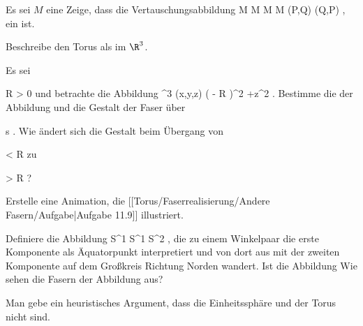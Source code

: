 {}
{

Es sei $M$ eine
Zeige, dass die Vertauschungsabbildung
\maabbeledisp {} {M \times M} { M \times M
} {(P,Q)} {(Q,P)
} {,}
ein
ist.

}
{} {}

{}
{

Beschreibe den Torus
 als
im $\R^3$.

}
{} {}

{}
{

Es sei

\mavergleichskette
{\vergleichskette
{ R
}
{ > }{ 0
}
{  }{
}
{    }{
}
{   }{
}
}
{}{}{}
und betrachte die Abbildung
\maabbeledisp {} { \R^3} { \R
} { (x,y,z) } { \left(  - R  \right)^2 +z^2
} {.}
Bestimme die
der Abbildung und die Gestalt der Faser über

\mavergleichskette
{\vergleichskette
{ s
}
{ \in }{ \R
}
{  }{
}
{    }{
}
{   }{
}
}
{}{}{.}
Wie ändert sich die Gestalt beim Übergang von

\mavergleichskette
{\vergleichskette
{ 
}
{ < }{ R
}
{  }{
}
{    }{
}
{   }{
}
}
{}{}{}
zu

\mavergleichskette
{\vergleichskette
{ 
}
{ > }{ R
}
{  }{
}
{    }{
}
{   }{
}
}
{}{}{?}

}
{} {}

{}
{

Erstelle eine Animation, die
[[Torus/Faserrealisierung/Andere Fasern/Aufgabe|Aufgabe 11.9]]
illustriert.

}
{} {}

{}
{

Definiere die Abbildung
\maabbdisp {} {S^1 \times S^1} { S^2
} {,}
die zu einem Winkelpaar
\mathl{(\alpha, \beta)}{} die erste Komponente als Äquatorpunkt interpretiert und von dort aus mit der zweiten Komponente auf dem Großkreis Richtung Norden wandert. Ist die Abbildung
Wie sehen die Fasern der Abbildung aus?

}
{} {}

{}
{

Man gebe ein heuristisches Argument, dass die Einheitssphäre
 und der Torus
 nicht
sind.

}
{} {}


